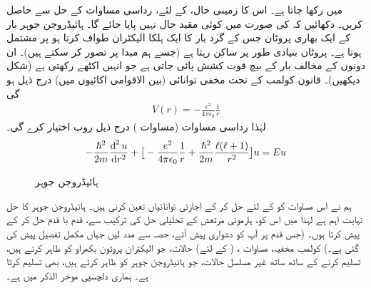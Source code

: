 میں رکھا جاتا ہے۔ اس کا زمینی حال،  کے لئے، رداسی مساوات کے حل سے حاصل کریں۔ دکھائیں کہ 
 کی صورت میں کوئی مقید حال نہیں پایا جائے گا۔
ہائیڈروجن جوہر بار  کے ایک بھاری پروٹان جس کے گرد بار  کا ایک ہلکا الیکٹران طواف کرتا ہو پر مشتمل ہوتا ہے۔ پروٹان بنیادی طور پر ساکن رہتا ہے (جسے ہم مبدا پر تصور کر سکتے ہیں)۔ ان دونوں کے مخالف بار کے بیچ قوت کشش پائی جاتی ہے جو انہیں اکٹھے رکھتی ہے (شکل  دیکھیں)۔ قانون کولمب کے تحت مخفی توانائی (بین الاقوامی اکائیوں میں) درج ذیل ہو گی 
 \begin{align}\label{مساوات_ابعادی_کولمب_مخفیہ}
V(r)=-\frac{e^{2}}{4\pi\epsilon_{0}}\frac{1}{r} 
\end{align}
لہٰذا رداسی مساوات (مساوات ) درج ذیل روپ اختیار کرے گی۔
\begin{align}\label{مساوات_ابعادی_رداسی_کولمب}
-\frac{\hslash^{2}}{2m}\frac{\dif^{\,2}{u}}{\dif r^{2}}+\big[-\frac{e^{2}}{4\pi\epsilon_{0}}\frac{1}{r}+\frac{\hslash^{2}}{2m}\frac{\ell(\ell+1)}{r^{2}}\big]u=Eu 
\end{align}


\begin{figure}
\centering
{}
\caption{ہائیڈروجن جوہر}
\label{شکل_تین_ابعادی_ہائیڈروجن_جوہر}
\end{figure}


 ہم نے اس مساوات کو  کے لئے حل کر کے اجازتی توانائیاں  تعین کرنی ہیں۔ ہائیڈروجن جوہر کا حل نہایت اہم ہے لہٰذا میں اس کو، ہارمونی مرتعش کے تحلیلی حل کی ترکیب سے، قدم با قدم حل کر کے پیش کرتا ہوں۔ (جس قدم پر آپ کو دشواری پیش آئے، حصہ  سے مدد لیں جہاں مکمل تفصیل پیش کی گئی ہے۔) کولمب مخفیہ، مساوات ، ( کے لئے)  حالات، جو الیکٹران پروٹون بکھراو کو ظاہر کرتے ہیں، تسلیم کرنے کے ساتھ ساتھ غیر مسلسل  حالات، جو ہائیڈروجن جوہر کو ظاہر کرتے ہیں، بھی تسلیم کرتا ہے۔ ہماری دلچسپی موخر الذکر میں ہے۔

